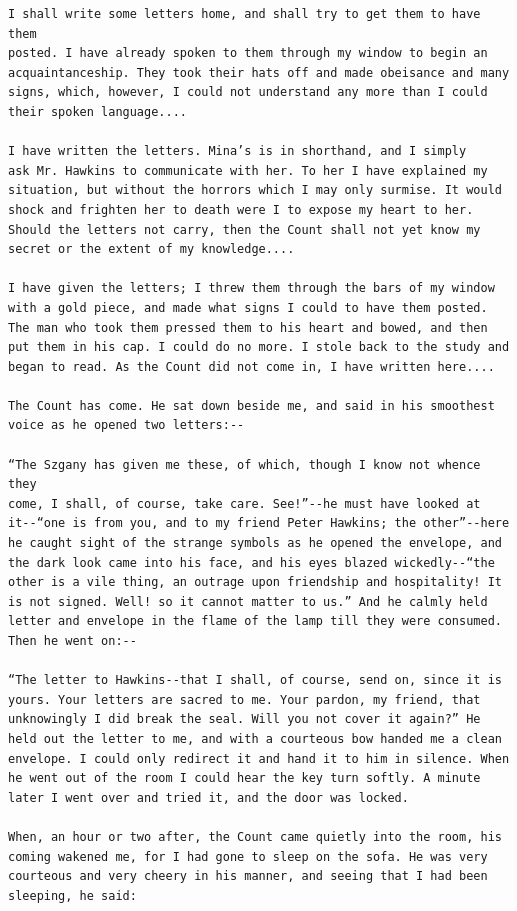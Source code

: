 \documentclass{article}
\begin{document}
\begin{verbatim}
I shall write some letters home, and shall try to get them to have them
posted. I have already spoken to them through my window to begin an
acquaintanceship. They took their hats off and made obeisance and many
signs, which, however, I could not understand any more than I could
their spoken language....

I have written the letters. Mina’s is in shorthand, and I simply
ask Mr. Hawkins to communicate with her. To her I have explained my
situation, but without the horrors which I may only surmise. It would
shock and frighten her to death were I to expose my heart to her.
Should the letters not carry, then the Count shall not yet know my
secret or the extent of my knowledge....

I have given the letters; I threw them through the bars of my window
with a gold piece, and made what signs I could to have them posted.
The man who took them pressed them to his heart and bowed, and then
put them in his cap. I could do no more. I stole back to the study and
began to read. As the Count did not come in, I have written here....

The Count has come. He sat down beside me, and said in his smoothest
voice as he opened two letters:--

“The Szgany has given me these, of which, though I know not whence they
come, I shall, of course, take care. See!”--he must have looked at
it--“one is from you, and to my friend Peter Hawkins; the other”--here
he caught sight of the strange symbols as he opened the envelope, and
the dark look came into his face, and his eyes blazed wickedly--“the
other is a vile thing, an outrage upon friendship and hospitality! It
is not signed. Well! so it cannot matter to us.” And he calmly held
letter and envelope in the flame of the lamp till they were consumed.
Then he went on:--

“The letter to Hawkins--that I shall, of course, send on, since it is
yours. Your letters are sacred to me. Your pardon, my friend, that
unknowingly I did break the seal. Will you not cover it again?” He
held out the letter to me, and with a courteous bow handed me a clean
envelope. I could only redirect it and hand it to him in silence. When
he went out of the room I could hear the key turn softly. A minute
later I went over and tried it, and the door was locked.

When, an hour or two after, the Count came quietly into the room, his
coming wakened me, for I had gone to sleep on the sofa. He was very
courteous and very cheery in his manner, and seeing that I had been
sleeping, he said:


\end{verbatim}
\end{document}
